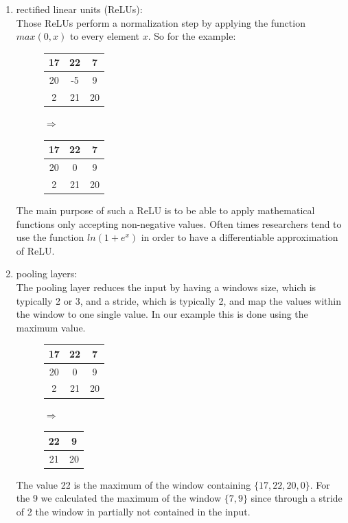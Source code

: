 \begin{enumerate}
\item rectified linear units (ReLUs):\\
	Those ReLUs perform a normalization step by applying the function $max(0,x)$ to every element $x$. So for the example:
	\begin{figure}[H]
		\centering
		\begin{tabular}{|c|c|c|} \hline
			17 & 22 & 7\\\hline
			20 & -5 & 9\\\hline
			2 & 21 & 20\\\hline
		\end{tabular}
		$\Rightarrow$
		\begin{tabular}{|c|c|c|} \hline
			17 & 22 & 7\\\hline
			20 & 0 & 9\\\hline
			2 & 21 & 20\\\hline
		\end{tabular}
	\end{figure}
	The main purpose of such a ReLU is to be able to apply mathematical functions only accepting non-negative values. Often times researchers tend to use the function $ln(1+e^x)$ in order to have a differentiable approximation of ReLU. 
\item pooling layers:\\
	The pooling layer reduces the input by having a windows size, which is typically 2 or 3, and a stride, which is typically 2, and map the values within the window to one single value. In our example this is done using the maximum value.
	\begin{figure}[H]
		\centering
		\begin{tabular}{|c|c|c|} \hline
			17 & 22 & 7\\\hline
			20 & 0 & 9\\\hline
			2 & 21 & 20\\\hline
		\end{tabular}
		$\Rightarrow$
		\begin{tabular}{|c|c|} \hline
			22 & 9 \\\hline
			21 & 20\\\hline
		\end{tabular}
	\end{figure}
	The value 22 is the maximum of the window containing $\{17,22,20,0\}$. For the 9 we calculated the maximum of the window $\{7,9\}$ since through a stride of 2 the window in partially not contained in the input.
\end{enumerate}

